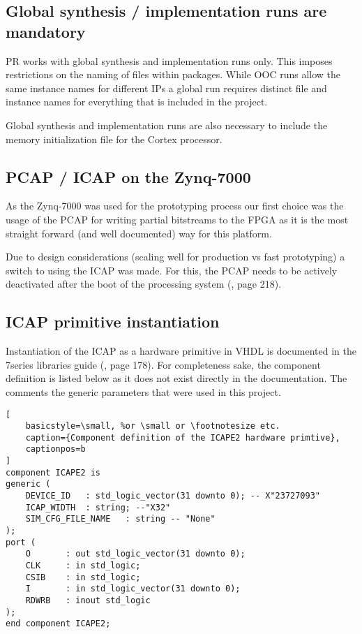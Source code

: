 \subsection{Global synthesis / implementation runs are mandatory}
\gls{PR} works with global synthesis and implementation runs only.
This imposes restrictions on the naming of files within packages. 
While \gls{OOC} runs allow the same instance names for different IPs a global run requires distinct file and instance names for everything that is included in the project.

Global synthesis and implementation runs are also necessary to include the memory initialization file for the Cortex processor. 

\subsection{\gls{PCAP} / \gls{ICAP} on the Zynq-7000}
As the Zynq-7000 was used for the prototyping process our first choice was the usage of the \gls{PCAP} for writing partial bitstreams to the \gls{FPGA} as it is the most straight forward (and well documented) way for this platform.

Due to design considerations (scaling well for production vs fast prototyping) a switch to using the \gls{ICAP} was made.
For this, the \gls{PCAP} needs to be actively deactivated after the boot of the processing system (\cite{zynq_7000_technical_manual}, page 218).

\subsection{\gls{ICAP} primitive instantiation}
Instantiation of the \gls{ICAP} as a hardware primitive in VHDL is documented in the 7series libraries guide (\cite{7series_libraries_guide}, page 178).
For completeness sake, the component definition is listed below as it does not exist directly in the documentation.
The comments the generic parameters that were used in this project.
\lstset{language=vhdl}
\begin{lstlisting}[
    basicstyle=\small, %or \small or \footnotesize etc.
    caption={Component definition of the ICAPE2 hardware primtive},
    captionpos=b
]
component ICAPE2 is
generic (
    DEVICE_ID   : std_logic_vector(31 downto 0); -- X"23727093" 
    ICAP_WIDTH  : string; --"X32"
    SIM_CFG_FILE_NAME 	: string -- "None"
);   
port (
    O 		: out std_logic_vector(31 downto 0);
    CLK 	: in std_logic;
    CSIB 	: in std_logic;
    I 		: in std_logic_vector(31 downto 0);
    RDWRB 	: inout std_logic
);
end component ICAPE2;
\end{lstlisting}
